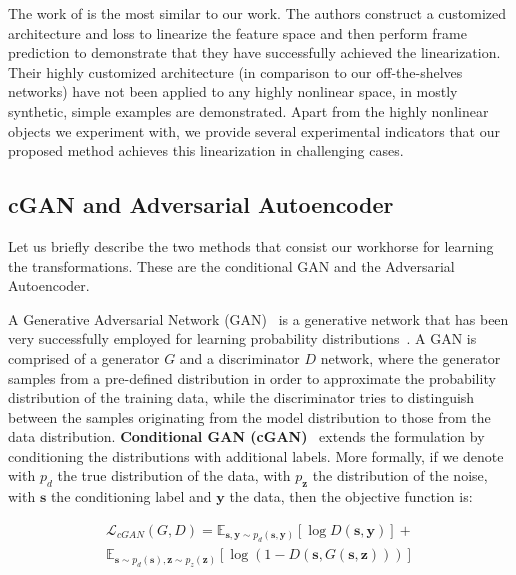 \documentclass[10pt,twocolumn,letterpaper]{article}
\begin{document}
The work of \cite{goroshin2015learning} is the most similar to our work. The authors construct a customized architecture and loss to linearize the feature space and then perform frame prediction to demonstrate that they have successfully achieved the linearization. Their highly customized architecture (in comparison to our off-the-shelves networks) have not been applied to any highly nonlinear space, in \cite{goroshin2015learning} mostly synthetic, simple examples are demonstrated. Apart from the highly nonlinear objects we experiment with, we provide several experimental indicators that our proposed method achieves this linearization in challenging cases.


\subsection{cGAN and Adversarial Autoencoder}\label{sec:linear_dynamics_describe_networks}
Let us briefly describe the two methods that consist our workhorse for learning the transformations. These are the conditional GAN and the Adversarial Autoencoder.

A Generative Adversarial Network (GAN)~\cite{goodfellow2014generative} is a generative network that has been very successfully employed for learning probability distributions~\cite{ledig2016photo}. A GAN is comprised of a generator $G$ and a discriminator $D$ network, where the generator samples from a pre-defined distribution in order to approximate the probability distribution of the training data, while the discriminator tries to distinguish between the samples originating from the model distribution to those from the data distribution. 
\textbf{Conditional GAN (cGAN)}~\cite{mirza2014conditional} extends the formulation by conditioning the distributions with additional labels. More formally, if we denote with $p_{d}$ the true distribution of the data, with $p_{\bm{z}}$ the distribution of the noise, with $\bm{s}$ the conditioning label and $\bm{y}$ the data, then the objective function is: 

\begin{equation}
\begin{split} %
    \mathcal{L}_{cGAN}(G, D) = \mathbb{E}_{\bm{s},\bm{y} \sim p_{d}(\bm{s},\bm{y})}[\log D(\bm{s},\bm{y})] + \\
    \mathbb{E}_{\bm{s} \sim p_{d}(\bm{s}), \bm{z} \sim p_{z}(\bm{z})}[\log (1-D(\bm{s},G(\bm{s},\bm{z})))]
    \label{eq:linear_dynamics_cgan_loss}
\end{split}
\end{equation}
\end{document}
